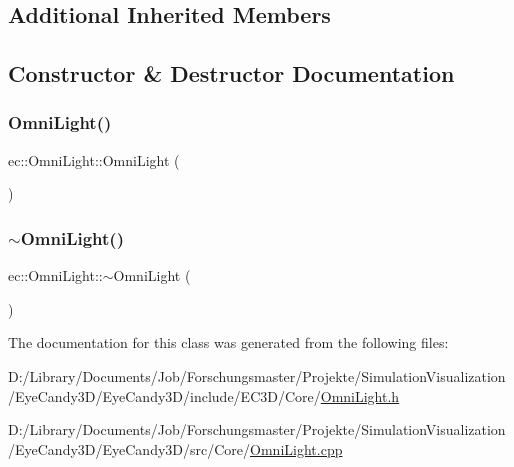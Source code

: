 \subsection*{Additional Inherited Members}


\subsection{Constructor \& Destructor Documentation}
\mbox{\label{classec_1_1_omni_light_aa0240a42641c82a0363f569fdc312f23}} 
\subsubsection{\texorpdfstring{Omni\+Light()}{OmniLight()}}
{\footnotesize\ttfamily ec\+::\+Omni\+Light\+::\+Omni\+Light (\begin{DoxyParamCaption}{ }\end{DoxyParamCaption})\hspace{0.3cm}{\ttfamily [explicit]}}

\mbox{\label{classec_1_1_omni_light_a58c4d1aaf29e659c03ee1193cbca3eed}} 
\subsubsection{\texorpdfstring{$\sim$\+Omni\+Light()}{~OmniLight()}}
{\footnotesize\ttfamily ec\+::\+Omni\+Light\+::$\sim$\+Omni\+Light (\begin{DoxyParamCaption}{ }\end{DoxyParamCaption})\hspace{0.3cm}{\ttfamily [default]}}



The documentation for this class was generated from the following files\+:\begin{DoxyCompactItemize}
\item 
D\+:/\+Library/\+Documents/\+Job/\+Forschungsmaster/\+Projekte/\+Simulation\+Visualization/\+Eye\+Candy3\+D/\+Eye\+Candy3\+D/include/\+E\+C3\+D/\+Core/\mbox{\hyperlink{_omni_light_8h}{Omni\+Light.\+h}}\item 
D\+:/\+Library/\+Documents/\+Job/\+Forschungsmaster/\+Projekte/\+Simulation\+Visualization/\+Eye\+Candy3\+D/\+Eye\+Candy3\+D/src/\+Core/\mbox{\hyperlink{_omni_light_8cpp}{Omni\+Light.\+cpp}}\end{DoxyCompactItemize}
